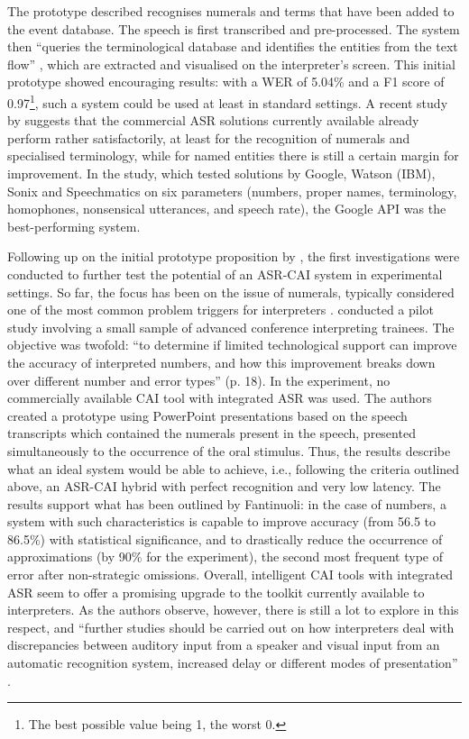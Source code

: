 The prototype described recognises numerals and terms that have been added to the event database. The speech is first transcribed and pre-processed. The system then ``queries the terminological database and identifies the entities from the text flow'' \citep[30]{fantinuoli_speech_2017}, which are extracted and visualised on the interpreter's screen. This initial prototype showed encouraging results: with a WER of 5.04\% and a F1 score of 0.97\footnote{The best possible value being 1, the worst 0.}, such a system could be used at least in standard settings. A recent study by \citet{brusewitz_simultandolmetschen_2019} suggests that the commercial ASR solutions currently available already perform rather satisfactorily, at least for the recognition of numerals and specialised terminology, while for named entities there is still a certain margin for improvement. In the study, which tested solutions by Google, Watson (IBM), Sonix and Speechmatics on six parameters (numbers, proper names, terminology, homophones, nonsensical utterances, and speech rate), the Google API was the best-performing system.

Following up on the initial prototype proposition by \citet{fantinuoli_speech_2017}, the first investigations were conducted to further test the potential of an ASR-CAI system in experimental settings. So far, the focus has been on the issue of numerals, typically considered one of the most common problem triggers for interpreters \citep{gile_basic_2009}. \citet{desmet_simultaneous_2018} conducted a pilot study involving a small sample of advanced conference interpreting trainees. The objective was twofold: ``to determine if limited technological support can improve the accuracy of interpreted numbers, and how this improvement breaks down over different number and error types'' (p. 18). In the experiment, no commercially available CAI tool with integrated ASR was used. The authors created a prototype using PowerPoint presentations based on the speech transcripts which contained the numerals present in the speech, presented simultaneously to the occurrence of the oral stimulus. Thus, the results describe what an ideal system would be able to achieve, i.e., following the criteria outlined above, an ASR-CAI hybrid with perfect recognition and very low latency. The results support what has been outlined by Fantinuoli: in the case of numbers, a system with such characteristics is capable to improve accuracy (from 56.5 to 86.5\%) with statistical significance, and to drastically reduce the occurrence of approximations (by 90\% for the experiment), the second most frequent type of error after non-strategic omissions. Overall, intelligent CAI tools with integrated ASR seem to offer a promising upgrade to the toolkit currently available to interpreters. As the authors observe, however, there is still a lot to explore in this respect, and ``further studies should be carried out on how interpreters deal with discrepancies between auditory input from a speaker and visual input from an automatic recognition system, increased delay or different modes of presentation'' \citep[26]{desmet_simultaneous_2018}.


